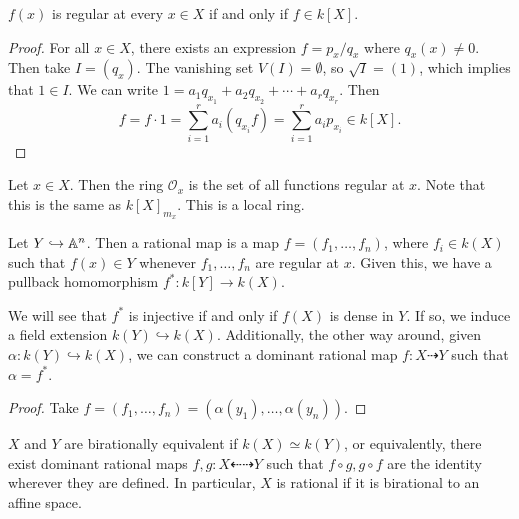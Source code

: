\documentclass[twoside, 10pt]{article}
\begin{document}
    \begin{prop}
        $f(x)$ is regular at every $x \in X$ if and only if $f \in k[X]$.
        \begin{proof}
            For all $x \in X$, there exists an expression $f = p_x/q_x$ where $q_x(x) \neq 0$. Then take $I = (q_x)$. The vanishing set $V(I) = \emptyset$, so $\sqrt{I} = (1)$, which implies that $1 \in I$. We can write $1 = a_1q_{x_1} + a_2q_{x_2} + \cdots + a_rq_{x_r}$. Then \[ f = f \cdot 1 = \sum_{i=1}^r a_i(q_{x_i}f) = \sum_{i=1}^r a_ip_{x_i} \in k[X]. \]
        \end{proof}
    \end{prop}
    
    \begin{defn}
        Let $x \in X$. Then the ring $\mathcal{O}_x$ is the set of all functions regular at $x$. Note that this is the same as $k[X]_{m_x}$. This is a local ring.
    \end{defn}

    \begin{defn}
        Let $Y \hookrightarrow \mathbb{A}^n$. Then a rational map is a map $f = (f_1, \ldots, f_n)$, where $f_i \in k(X)$ such that $f(x) \in Y$ whenever $f_1, \ldots, f_n$ are regular at $x$. Given this, we have a pullback homomorphism $f^*: k[Y] \rightarrow k(X)$.
    \end{defn}

    \begin{prop}
        We will see that $f^*$ is injective if and only if $f(X)$ is dense in $Y$. If so, we induce a field extension $k(Y) \hookrightarrow k(X)$. Additionally, the other way around, given $\alpha: k(Y) \hookrightarrow k(X)$, we can construct a dominant rational map $f:X \dashrightarrow Y$ such that $\alpha = f^*$.
        \begin{proof}
            Take $f = (f_1, \ldots, f_n) = (\alpha(y_1), \ldots, \alpha(y_n))$.
        \end{proof}
    \end{prop}

    \begin{defn}
        $X$ and $Y$ are birationally equivalent if $k(X) \simeq k(Y)$, or equivalently, there exist dominant rational maps $f,g: X \dashleftarrow \dashrightarrow Y$ such that $f \circ g, g \circ f$ are the identity wherever they are defined.
        In particular, $X$ is rational if it is birational to an affine space.
    \end{defn}
\end{document}
